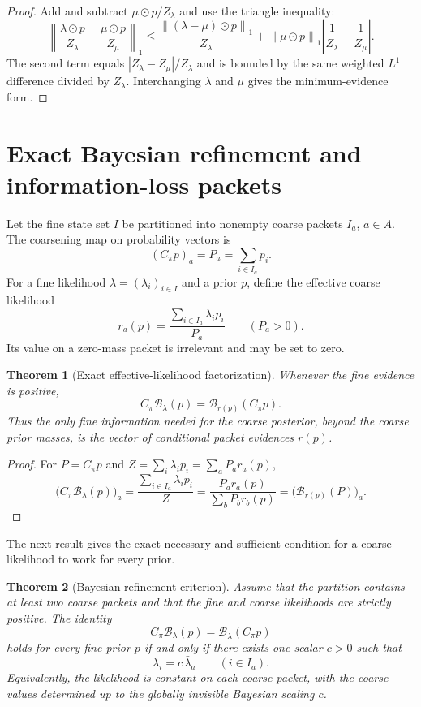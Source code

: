 \documentclass[11pt]{article}
\newtheorem{theorem}{Theorem}[section]
\theoremstyle{definition}
\theoremstyle{remark}
\newcommand{\cB}{\mathcal B}
\newcommand{\norm}[1]{\left\lVert#1\right\rVert}
\begin{document}
\begin{proof}
Add and subtract $\mu\odot p/Z_\lambda$ and use the triangle inequality:
\[
\norm{\frac{\lambda\odot p}{Z_\lambda}-\frac{\mu\odot p}{Z_\mu}}_1
\le
\frac{\norm{(\lambda-\mu)\odot p}_1}{Z_\lambda}
+
\norm{\mu\odot p}_1\left|\frac1{Z_\lambda}-\frac1{Z_\mu}\right|.
\]
The second term equals $|Z_\lambda-Z_\mu|/Z_\lambda$ and is bounded by the same weighted $L^1$ difference divided by $Z_\lambda$. Interchanging $\lambda$ and $\mu$ gives the minimum-evidence form.
\end{proof}

\section{Exact Bayesian refinement and information-loss packets}

Let the fine state set $I$ be partitioned into nonempty coarse packets $I_a$, $a\in A$.  The coarsening map on probability vectors is
\[
(C_\pi p)_a=P_a=\sum_{i\in I_a}p_i.
\]
For a fine likelihood $\lambda=(\lambda_i)_{i\in I}$ and a prior $p$, define the effective coarse likelihood
\[
r_a(p)
=
\frac{\sum_{i\in I_a}\lambda_i p_i}{P_a}
\qquad(P_a>0).
\]
Its value on a zero-mass packet is irrelevant and may be set to zero.

\begin{theorem}[Exact effective-likelihood factorization]
Whenever the fine evidence is positive,
\[
\boxed{
C_\pi\cB_\lambda(p)
=
\cB_{r(p)}(C_\pi p).}
\]
Thus the only fine information needed for the coarse posterior, beyond the coarse prior masses, is the vector of conditional packet evidences $r(p)$.
\end{theorem}

\begin{proof}
For $P=C_\pi p$ and $Z=\sum_i\lambda_ip_i=\sum_aP_ar_a(p)$,
\[
\bigl(C_\pi\cB_\lambda(p)\bigr)_a
=
\frac{\sum_{i\in I_a}\lambda_ip_i}{Z}
=
\frac{P_ar_a(p)}{\sum_bP_br_b(p)}
=
\bigl(\cB_{r(p)}(P)\bigr)_a.
\]
\end{proof}

The next result gives the exact necessary and sufficient condition for a coarse likelihood to work for every prior.

\begin{theorem}[Bayesian refinement criterion]
Assume that the partition contains at least two coarse packets and that the fine and coarse likelihoods are strictly positive.  The identity
\[
\boxed{
C_\pi\cB_\lambda(p)
=
\cB_{\bar\lambda}(C_\pi p)}
\]
holds for every fine prior $p$ if and only if there exists one scalar $c>0$ such that
\[
\boxed{
\lambda_i=c\,\bar\lambda_a
\qquad(i\in I_a).}
\]
Equivalently, the likelihood is constant on each coarse packet, with the coarse values determined up to the globally invisible Bayesian scaling $c$.
\end{theorem}
\end{document}
